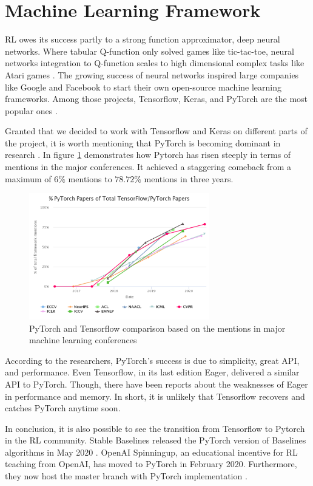 \section{Machine Learning Framework}


RL owes its success partly to a strong function approximator, deep neural networks. Where tabular Q-function only solved games like tic-tac-toe, neural networks integration to Q-function scales to high dimensional complex tasks like Atari games \cite{Mnih}. The growing success of neural networks inspired large companies like Google and Facebook to start their own open-source machine learning frameworks. Among those projects, Tensorflow, Keras, and PyTorch are the most popular ones \cite{Tensoflow} \cite{Keras} \cite{PyTorch}. 

Granted that we decided to work with Tensorflow and Keras on different parts of the project, it is worth mentioning that PyTorch is becoming dominant in research \cite{Horace}. In figure \ref{fig:ptvstf} demonstrates how Pytorch has risen steeply in terms of mentions in the major conferences. It achieved a staggering comeback from a maximum of \(6\%\) mentions to \(78.72\%\) mentions in three years.  

\begin{figure}[htbp] 
    \centering
    \includegraphics[width=0.7\textwidth]{figures/tfvspytorch}
    \caption{PyTorch and Tensorflow comparison based on the mentions in major machine learning conferences \cite{Horace}}
    \label{fig:ptvstf}
\end{figure}


According to the researchers, PyTorch's success is due to simplicity, great API, and performance. Even Tensorflow, in its last edition Eager, delivered a similar API to PyTorch. Though, there have been reports about the weaknesses of Eager in performance and memory. In short, it is unlikely that Tensorflow recovers and catches PyTorch anytime soon.

In conclusion, it is also possible to see the transition from Tensorflow to Pytorch in the RL community. Stable Baselines released the PyTorch version of Baselines algorithms in May 2020 \cite{stable-baselines3}. OpenAI Spinningup, an educational incentive for RL teaching from OpenAI, has moved to PyTorch in February 2020. Furthermore, they now host the master branch with PyTorch implementation \cite{SpinningUp2018}.

 